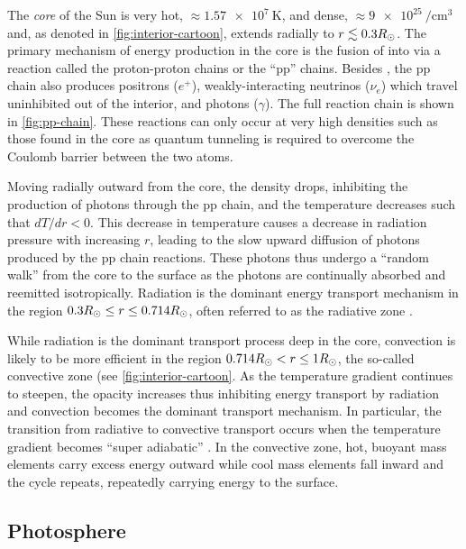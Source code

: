 The \textit{core} of the Sun is very hot, $\approx\SI{1.57e7}{\kelvin}$, and dense, $\approx\SI{9e25}{\per\cubic\cm}$ \citep{carroll_introduction_2007,bahcall_solar_2001} and, as denoted in \autoref{fig:interior-cartoon}, extends radially to $r\lesssim 0.3R_\odot$. The primary mechanism of energy production in the core is the fusion of  into  via a reaction called the proton-proton chains or the ``pp'' chains. Besides , the pp chain also produces positrons ($e^+$), weakly-interacting neutrinos ($\nu_e$) which travel uninhibited out of the interior, and photons ($\gamma$). The full reaction chain is shown in \autoref{fig:pp-chain}. These reactions can only occur at very high densities such as those found in the core as quantum tunneling is required to overcome the Coulomb barrier between the two  atoms.

Moving radially outward from the core, the density drops, inhibiting the production of photons through the pp chain, and the temperature decreases such that $dT/dr < 0$. This decrease in temperature causes a decrease in radiation pressure with increasing $r$, leading to the slow upward diffusion of photons produced by the pp chain reactions. These photons thus undergo a ``random walk'' from the core to the surface as the photons are continually absorbed and reemitted isotropically. Radiation is the dominant energy transport mechanism in the region $0.3R_\odot\le r\le 0.714R_\odot$, often referred to as the radiative zone \citep{carroll_introduction_2007}. 

While radiation is the dominant transport process deep in the core, convection is likely to be more efficient in the region $0.714R_\odot<r\le1R_\odot$, the so-called convective zone (see \autoref{fig:interior-cartoon}. As the temperature gradient continues to steepen, the opacity increases thus inhibiting energy transport by radiation and convection becomes the dominant transport mechanism. In particular, the transition from radiative to convective transport occurs when the temperature gradient becomes ``super adiabatic'' \citep[see Section 10.4 of][]{carroll_introduction_2007}. In the convective zone, hot, buoyant mass elements carry excess energy outward while cool mass elements fall inward and the cycle repeats, repeatedly carrying energy to the surface. 

\subsection{Photosphere}\label{sec:photosphere}

